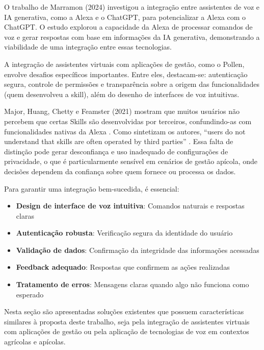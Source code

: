 O trabalho de Marramon (2024) investigou a integração entre assistentes de voz e IA generativa, como a Alexa e o ChatGPT, para potencializar a Alexa com o ChatGPT.
O estudo explorou a capacidade da Alexa de processar comandos de voz e gerar respostas com base em informações da IA generativa, demonstrando a viabilidade de uma integração entre essas tecnologias.


A integração de assistentes virtuais com aplicações de gestão, como o Pollen, envolve desafios específicos importantes. Entre eles, destacam-se: autenticação segura, controle de permissões e transparência sobre a origem das funcionalidades (quem desenvolveu a skill), além do desenho de interfaces de voz intuitivas.

Major, Huang, Chetty e Feamster (2021) mostram que muitos usuários não percebem que certas Skills são desenvolvidas por terceiros, confundindo-as com funcionalidades nativas da Alexa \cite{major2021alexa}. Como sintetizam os autores, “users do not understand that skills are often operated by third parties” \cite{major2021alexa}. Essa falta de distinção pode gerar desconfiança e uso inadequado de configurações de privacidade, o que é particularmente sensível em cenários de gestão apícola, onde decisões dependem da confiança sobre quem fornece ou processa os dados.

Para garantir uma integração bem-sucedida, é essencial:
\begin{itemize}
    \item \textbf{Design de interface de voz intuitiva}: Comandos naturais e respostas claras
    \item \textbf{Autenticação robusta}: Verificação segura da identidade do usuário
    \item \textbf{Validação de dados}: Confirmação da integridade das informações acessadas
    \item \textbf{Feedback adequado}: Respostas que confirmem as ações realizadas
    \item \textbf{Tratamento de erros}: Mensagens claras quando algo não funciona como esperado
\end{itemize}


Nesta seção são apresentadas soluções existentes que possuem características similares à proposta deste trabalho, seja pela integração de assistentes virtuais com aplicações de gestão ou pela aplicação de tecnologias de voz em contextos agrícolas e apícolas.

